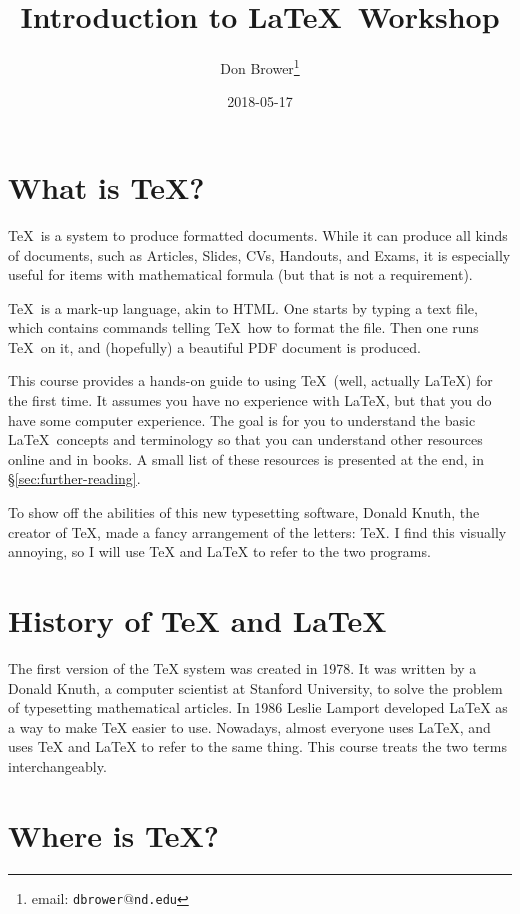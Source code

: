 \documentclass{article}
\begin{document}
\title{Introduction to \LaTeX\ Workshop}
\author{Don Brower\thanks{email: \texttt{dbrower$@$nd.edu}}}
\date{2018-05-17}
\maketitle

\section{What is \TeX?}

\TeX\ is a system to produce formatted documents.
While it can produce all kinds of documents, such as Articles, Slides, CVs, Handouts, and Exams,
it is especially useful for items with mathematical formula (but that is not a requirement).

\TeX\ is a mark-up language, akin to HTML.
One starts by typing a text file, which contains commands telling \TeX\ how to format the file.
Then one runs \TeX\ on it, and (hopefully) a beautiful PDF document is produced.

This course provides a hands-on guide to using \TeX\ (well, actually \LaTeX) for the first time.
It assumes you have no experience with \LaTeX, but that you do have some computer experience.
The goal is for you to understand the basic \LaTeX\ concepts and terminology so that you can
understand other resources online and in books.
A small list of these resources is presented at the end, in \S\ref{sec:further-reading}.

To show off the abilities of this new typesetting software, Donald Knuth, the creator of \TeX,
made a fancy arrangement of the letters: \TeX.
I find this visually annoying, so I will use TeX and LaTeX to refer to the two programs.

\section{History of TeX and LaTeX}

The first version of the TeX system was created in 1978.
It was written by a Donald Knuth, a computer scientist at Stanford University,
to solve the problem of typesetting mathematical articles.
In 1986 Leslie Lamport developed LaTeX as a way to make TeX easier to use.
Nowadays, almost everyone uses LaTeX, and uses TeX and LaTeX to refer to the same
thing.
This course treats the two terms interchangeably.

\section{Where is \TeX?}
\end{document}
